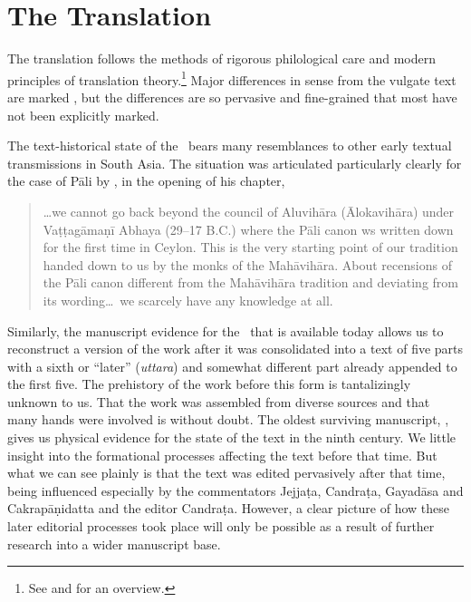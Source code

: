     
\section{The Translation}    
The translation follows the methods of rigorous philological care and
modern principles of translation theory.\footnote{See
    \cite[intro.]{wuja-2003} and \cite[81--83]{wuja-2021} for an
    overview.}  Major differences in sense from the vulgate text are
    marked  , but the differences are so pervasive
    and fine-grained that most have not been explicitly marked.

The text-historical state of the \SS\ bears many resemblances to other early 
textual transmissions in South Asia.  The situation was articulated particularly 
clearly for the case of Pāli by \citet{hinu-1978}, in the opening of his chapter, 
\begin{quote}
    \ldots we cannot go back beyond the council of Aluvihāra (Ālokavihāra) under 
    Vaṭṭagāmaṇī Abhaya (29--17 B.C.) where the Pāli canon ws written down for 
    the first time in Ceylon.  This is the very starting point of our tradition 
    handed down to us by the monks of the Mahāvihāra.  About recensions of 
    the Pāli canon different from the Mahāvihāra tradition and deviating from its 
    wording\ldots\ we scarcely have any knowledge at all.
\end{quote}
Similarly, the manuscript evidence for the \SS\ that is available
today allows us to reconstruct a version of the work after it was
consolidated into a text of five parts with a sixth or “later”
(\emph{uttara}) and somewhat different part already appended to the
first five.  The prehistory of the work before this form is
tantalizingly unknown to us.  That the work was assembled from diverse
sources and that many hands were involved is without doubt. The oldest
surviving manuscript, , gives us physical
evidence for the state of the text in the ninth century.  We little
insight into the formational processes affecting the text before that
time.  But what we can see plainly is that the text was edited
pervasively after that time, being influenced especially by the
commentators Jejjaṭa, Candraṭa, Gayadāsa and Cakrapāṇidatta and the
editor Candraṭa. However, a clear picture of how these later editorial
processes took place will only be possible as a result of further
research into a wider manuscript base.